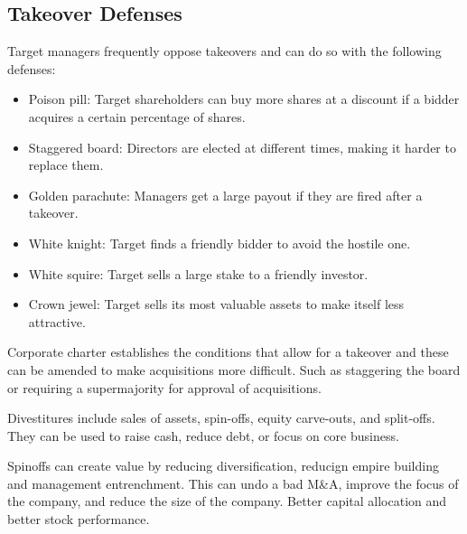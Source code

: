 \subsection{Takeover Defenses}
Target managers frequently oppose takeovers and can do so with the following defenses:
\begin{itemize}
    \item Poison pill: Target shareholders can buy more shares at a discount if a bidder acquires a certain percentage of shares.
    \item Staggered board: Directors are elected at different times, making it harder to replace them.
    \item Golden parachute: Managers get a large payout if they are fired after a takeover.
    \item White knight: Target finds a friendly bidder to avoid the hostile one.
    \item White squire: Target sells a large stake to a friendly investor.
    \item Crown jewel: Target sells its most valuable assets to make itself less attractive.
\end{itemize}
Corporate charter establishes the conditions that allow for a takeover and these can be amended to make acquisitions more difficult. Such as staggering the board or requiring a supermajority for approval of acquisitions.

Divestitures include sales of assets, spin-offs, equity carve-outs, and split-offs. They can be used to raise cash, reduce debt, or focus on core business.

Spinoffs can create value by reducing diversification, reducign empire building and management entrenchment.
This can undo a bad M\&A, improve the focus of the company, and reduce the size of the company. Better capital allocation and better stock performance.
